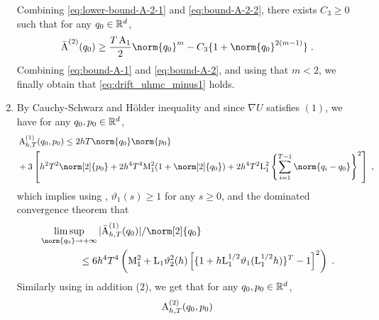 \begin{enumerate}[label=(\alph*),leftmargin=0cm,itemindent=0.5cm,labelwidth=1.2\itemindent,labelsep=0cm,align=left]
\begin{equation}
\end{equation}
Combining \eqref{eq:lower-bound-A-2-1} and \eqref{eq:bound-A-2-2}, there exists  $C_3 \geq 0$ such that for any $q_0 \in \mathbb{R}^d$,
\begin{equation}
\label{eq:bound-A-2}
\bar{\operatorname{A}}^{(2)}(\q_0) \geq \frac{T \constthree}{2} \norm{\q_0}^m - C_3 \{1 + \norm{\q_0}^{2(m-1)} \} \eqsp.
\end{equation}
Combining \eqref{eq:bound-A-1} and \eqref{eq:bound-A-2}, and using that $m < 2$, we finally obtain that \eqref{eq:drift_uhmc_minus1} holds.
\item  By Cauchy-Schwarz and Hölder inequality and since $\nabla U$ satisfies  $(1)$, we have for any $q_0,p_0 \in \mathbb{R}^d$,
\begin{align}
&\operatorname{A}^{(1)}_{h,T}(\q_0,\p_0)
\leq 2hT \norm{q_0} \norm{p_0} \\
& +3 \parentheseDeux{ h^2 T^2  \norm[2]{\p_0} +  2 h^4 T^4 \constzeroT^2 (1+ \norm[2]{ \q_0}) +   2 h^4 T^2  \constzero^2  \defEns{ \sum_{i=1}^{T-1} \norm{\q_i - q_0}}^2} \eqsp,
\end{align}
which implies using , $\vartheta_1(s) \geq 1$ for any $s \geq 0$, and the dominated convergence theorem that
\begin{align}
\label{eq:bound-A-1-m=2}
&\limsup_{\norm{q_0} \to \plusinfty} |\bar{\operatorname{A}}^{(1)}_{h,T}(\q_0)|/ \norm[2]{q_0}  \\
&\qquad \qquad \leq
6 h^4 T^4 \left(  \constzeroT^2 +  \constzero \vartheta_2^2(h) \left[ \{1 + h \constzero^{1/2} \vartheta_1(\constzero^{1/2} h)\}^T -1 \right]^2 \right)  \eqsp.
\end{align}
Similarly using in addition  ($2$), we get that for any $q_0,p_0 \in \mathbb{R}^d$,
\begin{align}
\operatorname{A}^{(2)}_{h,T}(\q_0,\p_0)

\end{align}
\end{enumerate}
